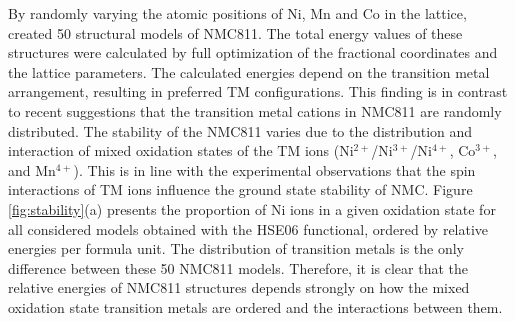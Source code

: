 \documentclass[journal=jacsat,manuscript=article]{achemso}
\newcommand{\re}[1]{\textcolor{red}{#1}}
\begin{document}
By randomly varying the atomic positions of Ni, Mn and Co in the lattice, \re{\citeauthor{rana}} created 50 structural models of NMC811. The total energy values of these structures were calculated by full optimization of the fractional coordinates and the lattice parameters. The calculated energies depend on the transition metal arrangement, resulting in preferred TM configurations. This finding is in contrast to recent suggestions that the transition metal cations in NMC811 are randomly distributed. \cite{Sun_JPhysChemC2017} The stability of the NMC811 varies due to the distribution and interaction of mixed oxidation states of the TM ions (Ni$^{2+}$/Ni$^{3+}$/Ni$^{4+}$, Co$^{3+}$, and Mn$^{4+}$). This is in line with the experimental observations that the spin interactions of TM ions influence the ground state stability of NMC. \cite{Xiao_NanoEner2018}  Figure \ref{fig:stability}(a) presents the proportion of Ni ions in a given oxidation state for all considered models obtained with the HSE06 functional, ordered by relative energies per formula unit. \cite{rana} The distribution of transition metals is the only difference between these 50 NMC811 models. Therefore, it is clear that the relative energies of NMC811 structures depends strongly on how the mixed oxidation state transition metals are ordered and the interactions between them.
\end{document}
